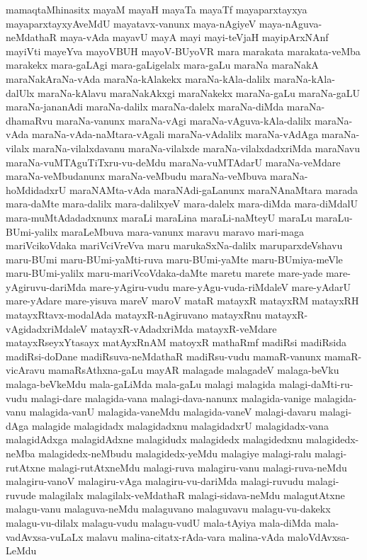 {mamaqtaMhinasitx
mayaM
mayaH
mayaTa
mayaTf
mayaparxtayxya
mayaparxtayxyAveMdU
mayatavx-vanunx
maya-nAgiyeV
maya-nAguva-neMdathaR
maya-vAda
mayavU
mayA
mayi
mayi-teVjaH
mayipArxNAnf
mayiVti
mayeYva
mayoVBUH
mayoV-BUyoVR
mara
marakata
marakata-veMba
marakekx
mara-gaLAgi
mara-gaLigelalx
mara-gaLu
maraNa
maraNakA
maraNakAraNa-vAda
maraNa-kAlakekx
maraNa-kAla-dalilx
maraNa-kAla-dalUlx
maraNa-kAlavu
maraNakAkxgi
maraNakekx
maraNa-gaLu
maraNa-gaLU
maraNa-jananAdi
maraNa-dalilx
maraNa-dalelx
maraNa-diMda
maraNa-dhamaRvu
maraNa-vanunx
maraNa-vAgi
maraNa-vAguva-kAla-dalilx
maraNa-vAda
maraNa-vAda-naMtara-vAgali
maraNa-vAdalilx
maraNa-vAdAga
maraNa-vilalx
maraNa-vilalxdavanu
maraNa-vilalxde
maraNa-vilalxdadxriMda
maraNavu
maraNa-vuMTAguTiTxru-vu-deMdu
maraNa-vuMTAdarU
maraNa-veMdare
maraNa-veMbudanunx
maraNa-veMbudu
maraNa-veMbuva
maraNa-hoMdidadxrU
maraNAMta-vAda
maraNAdi-gaLanunx
maraNAnaMtara
marada
mara-daMte
mara-dalilx
mara-dalilxyeV
mara-dalelx
mara-diMda
mara-diMdalU
mara-muMtAdadadxnunx
maraLi
maraLina
maraLi-naMteyU
maraLu
maraLu-BUmi-yalilx
maraLeMbuva
mara-vanunx
maravu
maravo
mari-maga
mariVcikoVdaka
mariVciVreVva
maru
marukaSxNa-dalilx
maruparxdeVshavu
maru-BUmi
maru-BUmi-yaMti-ruva
maru-BUmi-yaMte
maru-BUmiya-meVle
maru-BUmi-yalilx
maru-mariVcoVdaka-daMte
maretu
marete
mare-yade
mare-yAgiruvu-dariMda
mare-yAgiru-vudu
mare-yAgu-vuda-riMdaleV
mare-yAdarU
mare-yAdare
mare-yisuva
mareV
maroV
mataR
matayxR
matayxRM
matayxRH
matayxRtavx-modalAda
matayxR-nAgiruvano
matayxRnu
matayxR-vAgidadxriMdaleV
matayxR-vAdadxriMda
matayxR-veMdare
matayxRseyxYtasayx
matAyxRnAM
matoyxR
mathaRmf
madiRsi
madiRsida
madiRsi-doDane
madiRsuva-neMdathaR
madiRsu-vudu
mamaR-vanunx
mamaR-vicAravu
mamaRsAthxna-gaLu
mayAR
malagade
malagadeV
malaga-beVku
malaga-beVkeMdu
mala-gaLiMda
mala-gaLu
malagi
malagida
malagi-daMti-ru-vudu
malagi-dare
malagida-vana
malagi-dava-nanunx
malagida-vanige
malagida-vanu
malagida-vanU
malagida-vaneMdu
malagida-vaneV
malagi-davaru
malagi-dAga
malagide
malagidadx
malagidadxnu
malagidadxrU
malagidadx-vana
malagidAdxga
malagidAdxne
malagidudx
malagidedx
malagidedxnu
malagidedx-neMba
malagidedx-neMbudu
malagidedx-yeMdu
malagiye
malagi-ralu
malagi-rutAtxne
malagi-rutAtxneMdu
malagi-ruva
malagiru-vanu
malagi-ruva-neMdu
malagiru-vanoV
malagiru-vAga
malagiru-vu-dariMda
malagi-ruvudu
malagi-ruvude
malagilalx
malagilalx-veMdathaR
malagi-sidava-neMdu
malagutAtxne
malagu-vanu
malaguva-neMdu
malaguvano
malaguvavu
malagu-vu-dakekx
malagu-vu-dilalx
malagu-vudu
malagu-vudU
mala-tAyiya
mala-diMda
mala-vadAvxsa-vuLaLx
malavu
malina-citatx-rAda-vara
malina-vAda
maloVdAvxsa-LeMdu
}
